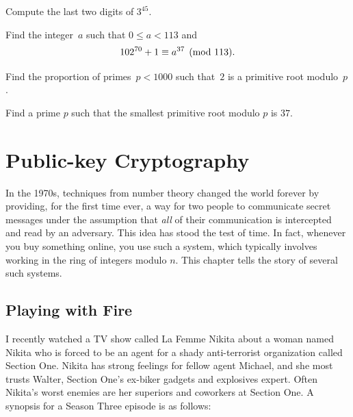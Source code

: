 \begin{exercises}
\item\label{ex:pow} Compute the last two digits
of $3^{45}$.

\item\label{ex:pow2}
Find the integer~$a$ such that $0\leq a < 113$ and
$$
  102^{70}+1 \equiv a^{37}\pmod{113}.
$$

\item  \label{ex:comp_prop} Find the proportion of primes~$p<1000$
such that~$2$ is a primitive root modulo~$p$.

\item \label{ex:pr2} Find a prime $p$ such that the smallest
primitive root modulo $p$ is $37$.

\end{exercises}



\chapter{Public-key Cryptography}\label{ch:crypto}

In the 1970s, techniques from number theory changed the world forever
by providing, for the first time ever, a way for two people to
communicate secret messages under the assumption that {\em all} of
their communication is intercepted and read by an adversary.  This
idea has stood the test of time.  In fact, whenever you buy something
online, you use such a system, which typically involves working in the
ring of integers modulo $n$.  This chapter tells the story of several
such systems.

\section{Playing with Fire}

I recently watched a TV show
called La Femme Nikita about a woman
named Nikita who is forced to be an agent for a shady
anti-terrorist organization
called Section One.  Nikita has strong feelings for fellow agent
Michael, and she most trusts Walter, Section One's
ex-biker gadgets and explosives expert.  Often Nikita's worst enemies
are her superiors and coworkers at Section One.
A synopsis for a Season Three episode is as follows:

